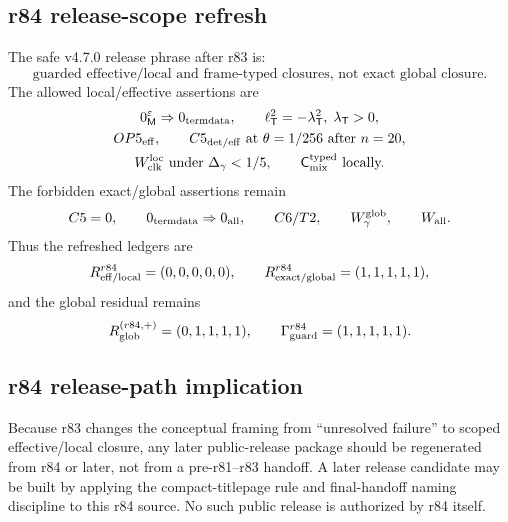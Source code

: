 \subsection*{r84 release-scope refresh}
\label{subsec:r84-release-scope-refresh}
The safe v4.7.0 release phrase after r83 is:
\[
\boxed{\text{guarded effective/local and frame-typed closures, not exact global closure.}}
\]
The allowed local/effective assertions are
\[
\begin{gathered}
0_{\mathsf M}^{\varepsilon}\Rightarrow0_{\rm termdata},\qquad
\ell_{\mathsf T}^{2}=-\lambda_{\mathsf T}^{2},\;\lambda_{\mathsf T}>0,\\
OP5_{\rm eff},\qquad C5_{\rm det/eff}\text{ at }\theta=1/256\text{ after }n=20,\\
W_{\rm clk}^{\rm loc}\text{ under }\Delta_{\gamma}<1/5,
\qquad \mathsf C_{\rm mix}^{\rm typed}\text{ locally.}
\end{gathered}
\]
The forbidden exact/global assertions remain
\[
C5=0,
\qquad
0_{\rm termdata}\Rightarrow0_{\rm all},
\qquad
C6/T2,
\qquad
W_{\gamma}^{\rm glob},
\qquad
W_{\rm all}.
\]
Thus the refreshed ledgers are
\[
R_{\rm eff/local}^{r84}=(0,0,0,0,0),
\qquad
R_{\rm exact/global}^{r84}=(1,1,1,1,1),
\]
and the global residual remains
\[
R_{\rm glob}^{(r84,+)}=(0,1,1,1,1),
\qquad
\Gamma_{\rm guard}^{r84}=(1,1,1,1,1).
\]

\subsection*{r84 release-path implication}
\label{subsec:r84-release-path-implication}
Because r83 changes the conceptual framing from ``unresolved failure'' to scoped
effective/local closure, any later public-release package should be regenerated from r84 or later,
not from a pre-r81--r83 handoff.  A later release candidate may be built by applying the compact-titlepage
rule and final-handoff naming discipline to this r84 source.  No such public release is
authorized by r84 itself.



